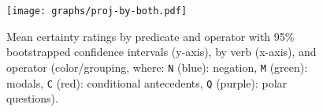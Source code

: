 	\begin{figure}[ht]
		\vspace{-.8\baselineskip}
		\centering
		\texttt{[image: graphs/proj-by-both.pdf]}\vspace{-1.2\baselineskip}
		\caption{\small Mean certainty ratings by predicate and operator with 95\% bootstrapped confidence intervals (y-axis), by verb (x-axis), and operator (color/grouping, where: \texttt{N} (blue): negation, \texttt{M} (green): modals, \texttt{C} (red): conditional antecedents, \texttt{Q} (purple): polar questions).}
		\label{fig:figure2}
	\end{figure}



